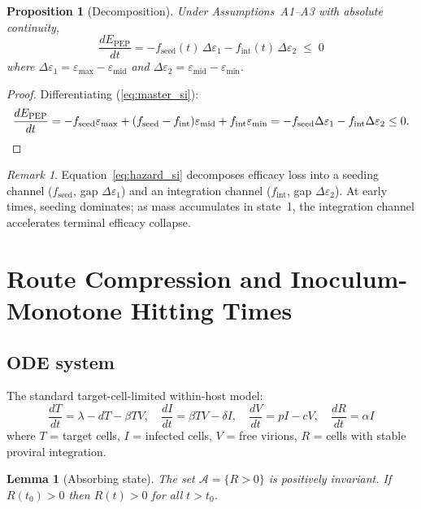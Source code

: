 \documentclass[11pt]{article}
\newtheorem{lemma}{Lemma}[section]
\newtheorem{proposition}{Proposition}[section]
\theoremstyle{definition}
\theoremstyle{remark}
\newtheorem*{remark}{Remark}
\newcommand{\Epep}{E_{\text{PEP}}}
\newcommand{\emax}{\varepsilon_{\max}}
\newcommand{\emid}{\varepsilon_{\text{mid}}}
\newcommand{\emin}{\varepsilon_{\min}}
\begin{document}
\begin{proposition}[Decomposition]\label{prop:hazard}
Under Assumptions~A1--A3 with absolute continuity,
\begin{equation}
\frac{d\Epep}{dt} = -f_{\text{seed}}(t)\,\Delta\varepsilon_{1} - f_{\text{int}}(t)\,\Delta\varepsilon_{2} \;\leq\; 0
\label{eq:hazard_si}
\end{equation}
where $\Delta\varepsilon_{1} = \emax - \emid$ and $\Delta\varepsilon_{2} = \emid - \emin$.
\end{proposition}

\begin{proof}
Differentiating (\ref{eq:master_si}):
\[
\frac{d\Epep}{dt} = -f_{\text{seed}}\emax + (f_{\text{seed}} - f_{\text{int}})\emid + f_{\text{int}}\emin = -f_{\text{seed}}\Delta\varepsilon_{1} - f_{\text{int}}\Delta\varepsilon_{2} \leq 0. \qedhere
\]
\end{proof}

\begin{remark}
Equation~\ref{eq:hazard_si} decomposes efficacy loss into a seeding channel ($f_{\text{seed}}$, gap $\Delta\varepsilon_{1}$) and an integration channel ($f_{\text{int}}$, gap $\Delta\varepsilon_{2}$). At early times, seeding dominates; as mass accumulates in state~1, the integration channel accelerates terminal efficacy collapse.
\end{remark}

\section{Route Compression and Inoculum-Monotone Hitting Times}

\subsection{ODE system}

The standard target-cell-limited within-host model:
\begin{equation}
\frac{dT}{dt} = \lambda - dT - \beta TV, \quad
\frac{dI}{dt} = \beta TV - \delta I, \quad
\frac{dV}{dt} = pI - cV, \quad
\frac{dR}{dt} = \alpha I
\label{eq:ode}
\end{equation}
where $T$ = target cells, $I$ = infected cells, $V$ = free virions, $R$ = cells with stable proviral integration.

\begin{lemma}[Absorbing state]\label{lem:absorb}
The set $\mathcal{A} = \{R > 0\}$ is positively invariant. If $R(t_{0}) > 0$ then $R(t) > 0$ for all $t > t_{0}$.
\end{lemma}
\end{document}
